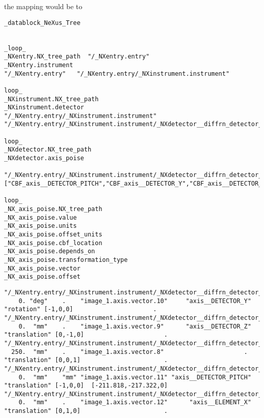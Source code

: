 \documentclass[11pt]{article}
\begin{document}
{{the mapping would be to 

\begin{verbatim}
_datablock_NeXus_Tree


_loop_
_NXentry.NX_tree_path  "/_NXentry.entry"
_NXentry.instrument   
"/_NXentry.entry"   "/_NXentry.entry/_NXinstrument.instrument"

loop_
_NXinstrument.NX_tree_path 
_NXinstrument.detector   
"/_NXentry.entry/_NXinstrument.instrument" "/_NXentry.entry/_NXinstrument.instrument/_NXdetector__diffrn_detector__detector"

loop_
_NXdetector.NX_tree_path 
_NXdetector.axis_poise  

"/_NXentry.entry/_NXinstrument.instrument/_NXdetector__diffrn_detector__detector__axis_poise"  
["CBF_axis__DETECTOR_PITCH","CBF_axis__DETECTOR_Y","CBF_axis__DETECTOR_Z","CBF_axis__ELEMENT_X","CBF_axis__ELEMENT_Y"]

loop_
_NX_axis_poise.NX_tree_path
_NX_axis_poise.value
_NX_axis_poise.units
_NX_axis_poise.offset_units
_NX_axis_poise.cbf_location
_NX_axis_poise.depends_on
_NX_axis_poise.transformation_type
_NX_axis_poise.vector
_NX_axis_poise.offset
\end{verbatim}

{\scriptsize \begin{verbatim}
"/_NXentry.entry/_NXinstrument.instrument/_NXdetector__diffrn_detector__detector__axis_poise__axis__DETECTOR_PITCH"
    0. "deg"    .    "image_1.axis.vector.10"     "axis__DETECTOR_Y"    "rotation" [-1,0,0]                      .
"/_NXentry.entry/_NXinstrument.instrument/_NXdetector__diffrn_detector__detector__axis_poise__axis__DETECTOR_Y"
    0.  "mm"    .    "image_1.axis.vector.9"      "axis__DETECTOR_Z" "translation" [0,-1,0]                      .
"/_NXentry.entry/_NXinstrument.instrument/_NXdetector__diffrn_detector__detector__axis_poise__axis__DETECTOR_Z"
  250.  "mm"    .    "image_1.axis.vector.8"                      .  "translation" [0,0,1]                       .
"/_NXentry.entry/_NXinstrument.instrument/_NXdetector__diffrn_detector__detector__axis_poise__axis__ELEMENT_X"
    0.  "mm"    "mm" "image_1.axis.vector.11" "axis__DETECTOR_PITCH" "translation" [-1,0,0]  [-211.818,-217.322,0]
"/_NXentry.entry/_NXinstrument.instrument/_NXdetector__diffrn_detector__detector__axis_poise__axis__ELEMENT_Y"
    0.  "mm"    .    "image_1.axis.vector.12"      "axis__ELEMENT_X" "translation" [0,1,0]                       .

\end{verbatim}}

}}
\end{document}
